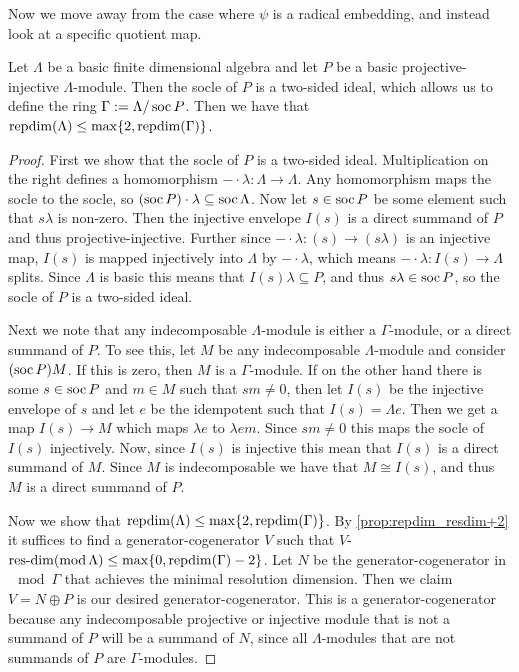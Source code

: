 Now we move away from the case where $\psi$ is a radical embedding, and instead look at a specific quotient map.

\begin{theorem}\label{thm:mod_out_socle}
	Let $\Lambda$ be a basic finite dimensional algebra and let $P$ be a basic projective-injective $\Lambda$-module. Then the socle of $P$ is a two-sided ideal, which allows us to define the ring $\Gamma := \Lambda / \operatorname{soc} P$. Then we have that $\operatorname{repdim}(\Lambda) \leq \max\{2, \operatorname{repdim}(\Gamma)\}$. 
	\begin{proof}
		First we show that the socle of $P$ is a two-sided ideal. Multiplication on the right defines a homomorphism $-\cdot \lambda\colon \Lambda \to \Lambda$. Any homomorphism maps the socle to the socle, so $(\operatorname{soc} P) \cdot \lambda \subseteq \operatorname{soc} \Lambda$. Now let $s \in \operatorname{soc} P$ be some element such that $s\lambda$ is non-zero. Then the injective envelope $I(s)$ is a direct summand of $P$ and thus projective-injective. Further since $-\cdot \lambda\colon (s) \to (s\lambda)$ is an injective map, $I(s)$ is mapped injectively into $\Lambda$ by $-\cdot \lambda$, which means $-\cdot\lambda\colon I(s) \to \Lambda$ splits. Since $\Lambda$ is basic this means that $I(s)\lambda \subseteq P$, and thus $s\lambda \in \operatorname{soc} P$, so the socle of $P$ is a two-sided ideal.
		
		Next we note that any indecomposable $\Lambda$-module is either a $\Gamma$-module, or a direct summand of $P$. To see this, let $M$ be any indecomposable $\Lambda$-module and consider $(\operatorname{soc} P)M$. If this is zero, then $M$ is a $\Gamma$-module. If on the other hand there is some $s \in \operatorname{soc} P$ and $m \in M$ such that $sm \neq 0$, then let $I(s)$ be the injective envelope of $s$ and let $e$ be the idempotent such that $I(s) = \Lambda e$. Then we get a map $I(s) \to M$ which maps $\lambda e$ to $\lambda e m$. Since $sm \neq 0$ this maps the socle of $I(s)$ injectively. Now, since $I(s)$ is injective this mean that $I(s)$ is a direct summand of $M$. Since $M$ is indecomposable we have that $M \cong I(s)$, and thus $M$ is a direct summand of $P$.
		
		Now we show that $\operatorname{repdim}(\Lambda) \leq \max\{2, \operatorname{repdim}(\Gamma)\}$. By \cref{prop:repdim_resdim+2} it suffices to find a generator-cogenerator $V$ such that $V$-$\operatorname{res-dim}(\operatorname{mod} \Lambda) \leq \max\{0, \operatorname{repdim}(\Gamma)-2\}$. Let $N$ be the generator-cogenerator in $\mod\Gamma$ that achieves the minimal resolution dimension. Then we claim $V = N \oplus P$ is our desired generator-cogenerator. This is a generator-cogenerator because any indecomposable projective or injective module that is not a summand of $P$ will be  a summand of $N$, since all $\Lambda$-modules that are not summands of $P$ are $\Gamma$-modules.
		

\end{proof}
\end{theorem}
